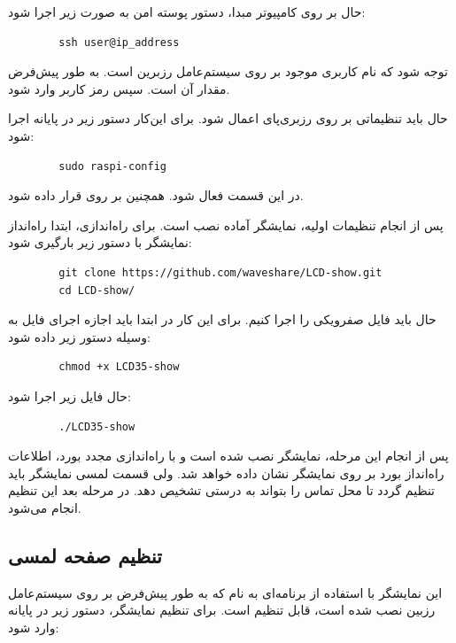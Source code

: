 حال بر روی کامپیوتر مبدا، دستور پوسته امن به صورت زیر اجرا شود:
\begin{latin}
    \begin{lstlisting}
        ssh user@ip_address
    \end{lstlisting}
\end{latin}
توجه شود که  نام کاربری موجود بر روی سیستم‌عامل رزبرین است. به طور پیش‌فرض مقدار آن  است. سپس رمز کاربر وارد شود.

حال باید تنظیماتی بر روی رزبری‌پای اعمال شود. برای این‌کار دستور زیر در پایانه اجرا شود:
\begin{latin}
    \begin{lstlisting}
        sudo raspi-config
    \end{lstlisting}
\end{latin}

در این قسمت  فعال شود. همچنین  بر روی  قرار داده شود.

 پس از انجام تنظیمات اولیه، نمایشگر آماده نصب است. برای راه‌اندازی، ابتدا راه‌انداز نمایشگر با دستور زیر بارگیری شود:
\begin{latin}
    \begin{lstlisting}
        git clone https://github.com/waveshare/LCD-show.git
        cd LCD-show/
    \end{lstlisting}
\end{latin}

حال باید فایل صفرویکی  را اجرا کنیم. برای این کار در ابتدا‌ باید اجازه اجرای فایل به وسیله دستور زیر داده شود:
\begin{latin}
    \begin{lstlisting}
        chmod +x LCD35-show
    \end{lstlisting}
\end{latin}
حال فایل زیر اجرا شود:

\begin{latin}
    \begin{lstlisting}
        ./LCD35-show
    \end{lstlisting}
\end{latin}
پس از انجام این مرحله، نمایشگر نصب شده است و با راه‌اندازی مجدد بورد، اطلاعات راه‌انداز بورد بر روی نمایشگر نشان داده خواهد شد. ولی قسمت لمسی نمایشگر باید تنظیم گردد تا محل تماس را بتواند به درستی تشخیص دهد. در مرحله بعد این تنظیم انجام می‌شود.

\subsection{تنظیم صفحه لمسی}
این نمایشگر با استفاده از برنامه‌ای به نام  که به طور پیش‌فرض بر روی سیستم‌عامل رزبین نصب شده است، قابل تنظیم است. برای تنظیم نمایشگر، دستور زیر در پایانه وارد شود:

